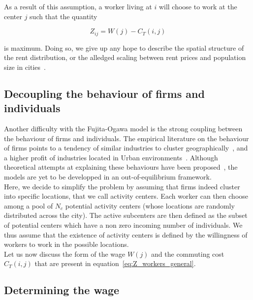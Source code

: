 As a result of this assumption, a worker living at $i$
will choose to work at the center $j$ such that the quantity
 
\begin{equation}
    Z_{ij} = W(j) - C_T(i,j)
    \label{eq:Z_workers_general}
\end{equation}

is maximum. Doing so, we give up any hope to describe the spatial structure of the rent
distribution, or the alledged scaling between rent prices and population size in
cities~\cite{Bettencourt:2013}.

\subsection{Decoupling the behaviour of firms and individuals}
\label{sub:decoupling_the_dynamics_of_}

Another difficulty with the Fujita-Ogawa model is the strong coupling between
the behaviour of firms and individuals. The empirical literature on the
behaviour of firms points to a tendency of similar industries to cluster
geographically~\cite{Duranton:2005, Marcon:2009}, and a higher
profit of industries located in Urban environments~\cite{Melo:2009}. Although
theoretical attempts at explaining these behaviours have been
proposed~\cite{Duranton:2004}, the models are yet to be developped in an
out-of-equilibrium framework.\\

Here, we decide to simplify the problem by assuming that firms indeed cluster
into specific locations, that we call activity centers. Each worker can then
choose among a pool of $N_c$ potential activity centers (whose locations are
randomly distributed across the city). The active subcenters are then
defined as the subset of potential centers which have a non zero incoming number
of individuals. We thus assume that the existence of activity centers is defined
by the willingness of workers to work in the possible locations.\\


Let us now discuss the form of the wage $W(j)$ and the commuting cost $C_T(i,j)$ that are
present in equation~\ref{eq:Z_workers_general}. 

\subsection{Determining the wage}
\label{sub:determining_the_wage}

